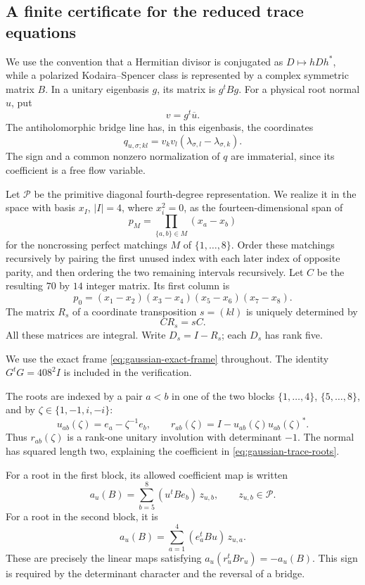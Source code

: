 \subsection{A finite certificate for the reduced trace equations}
\label{subsec:gaussian-trace-certificate}

We use the convention that a Hermitian divisor is conjugated as
\(D\mapsto hDh^*\), while a polarized Kodaira--Spencer class is represented
by a complex symmetric matrix \(B\).  In a unitary eigenbasis \(g\), its
matrix is \(g^tBg\).  For a physical root normal \(u\), put
\[
 v=g^t\overline u.
\]
The antiholomorphic bridge line has, in this eigenbasis, the coordinates
\[
 q_{u,\sigma;kl}
   =v_kv_l(\lambda_{\sigma,l}-\lambda_{\sigma,k}).
\]
The sign and a common nonzero normalization of \(q\) are immaterial,
since its coefficient is a free flow variable.

Let \(\mathcal P\) be the primitive diagonal fourth-degree representation.
We realize it in the space with basis \(x_I\), \(|I|=4\), where
\(x_i^2=0\), as the fourteen-dimensional span of
\[
 p_M=\prod_{\{a,b\}\in M}(x_a-x_b)
\]
for the noncrossing perfect matchings \(M\) of
\(\{1,\ldots,8\}\).  Order these matchings recursively by pairing the
first unused index with each later index of opposite parity, and then
ordering the two remaining intervals recursively.  Let \(C\) be the
resulting \(70\) by \(14\) integer matrix.  Its first column is
\[
 p_0=(x_1-x_2)(x_3-x_4)(x_5-x_6)(x_7-x_8).
\]
The matrix \(R_s\) of a coordinate transposition \(s=(kl)\) is uniquely
determined by
\[
 CR_s=sC.
\]
All these matrices are integral.  Write \(D_s=I-R_s\); each \(D_s\)
has rank five.

We use the exact frame \eqref{eq:gaussian-exact-frame} throughout.
The identity \(G^tG=408^2I\) is included in the verification.

The roots are indexed by a pair \(a<b\) in one of the two blocks
\(\{1,\ldots,4\}\), \(\{5,\ldots,8\}\), and by
\(\zeta\in\{1,-1,i,-i\}\):
\begin{equation}
 u_{ab}(\zeta)=e_a-\zeta^{-1}e_b,\qquad
 r_{ab}(\zeta)=I-u_{ab}(\zeta)u_{ab}(\zeta)^*.
 \label{eq:gaussian-trace-roots}
\end{equation}
Thus \(r_{ab}(\zeta)\) is a rank-one unitary involution with determinant
\(-1\).  The normal has squared length two, explaining the coefficient
in \eqref{eq:gaussian-trace-roots}.

For a root in the first block, its allowed coefficient map is written
\begin{equation}
 a_u(B)=\sum_{b=5}^{8}(u^tBe_b)\,z_{u,b},
 \qquad z_{u,b}\in\mathcal P.
 \label{eq:gaussian-trace-potential-u}
\end{equation}
For a root in the second block, it is
\begin{equation}
 a_u(B)=\sum_{a=1}^{4}(e_a^tBu)\,z_{u,a}.
 \label{eq:gaussian-trace-potential-v}
\end{equation}
These are precisely the linear maps satisfying
\(a_u(r_u^tBr_u)=-a_u(B)\).  This sign is required by the determinant
character and the reversal of a bridge.

